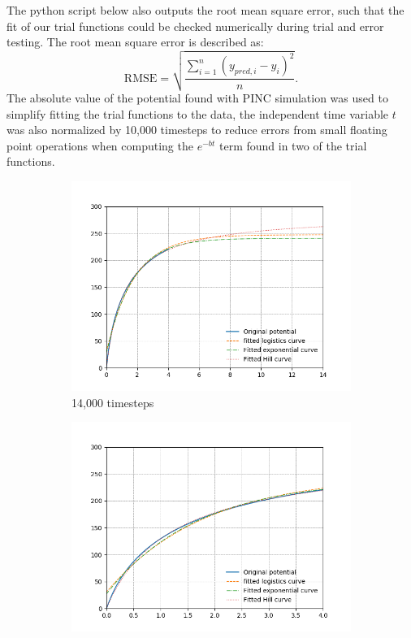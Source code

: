 The python script below also outputs the root mean square error, such that the fit of our trial functions could be checked numerically during trial and error testing. The root mean square error is described as:
\begin{equation}\label{eq:RMSE}
    \text{RMSE} = \sqrt{\frac{\sum^n_{i=1} \left(y_{pred,i} - y_i \right)^2}{n}}.
\end{equation}
The absolute value of the potential found with PINC simulation was used to simplify fitting the trial functions to the data, the independent time variable $t$ was also normalized by 10,000 timesteps to reduce errors from small floating point operations when computing the $e^{-b t}$ term found in two of the trial functions.
\begin{center}
\begin{figure}[H]
  \begin{subfigure}[b]{0.61\textwidth}
    \includegraphics[width=\textwidth]{figures/Appendix/C_fit_NB.png}
    \caption{14,000 timesteps}
    \label{fig:C_fit_NB}
  \end{subfigure}
  \hfill
  \begin{subfigure}[b]{0.61\textwidth}
    \includegraphics[width=\textwidth]{figures/Appendix/C_fit_NB_lim.png}

\end{subfigure}
\end{figure}
\end{center}
